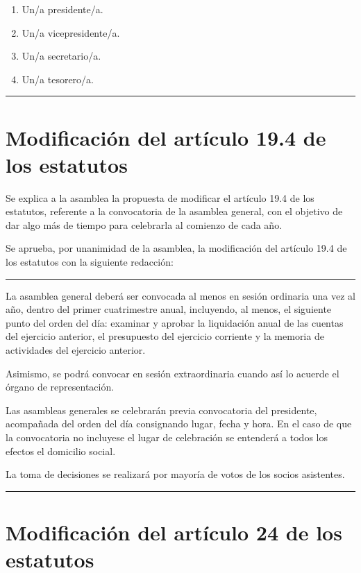 \documentclass[a4paper, 12pt]{article}
\begin{document}
\begin{enumerate}
    \item Un/a presidente/a.  
    \item Un/a vicepresidente/a.  
    \item Un/a secretario/a.  
    \item Un/a tesorero/a.  
\end{enumerate}

\hrule

\section{Modificación del artículo 19.4 de los estatutos}

Se explica a la asamblea la propuesta de modificar el artículo 19.4 de los estatutos, referente a la convocatoria de la asamblea general, con el objetivo de dar algo más de tiempo para celebrarla al comienzo de cada año.

Se aprueba, por unanimidad de la asamblea, la modificación del artículo 19.4 de los estatutos con la siguiente redacción:\\

\hrule
\vspace{3mm}

La asamblea general deberá ser convocada al menos en sesión ordinaria una vez al año, dentro del primer cuatrimestre anual, incluyendo, al menos, el siguiente punto del orden del día: examinar y aprobar la liquidación anual de las cuentas del ejercicio anterior, el presupuesto del ejercicio corriente y la memoria de actividades del ejercicio anterior.

Asimismo, se podrá convocar en sesión extraordinaria cuando así lo acuerde el órgano de representación.

Las asambleas generales se celebrarán previa convocatoria del presidente, acompañada del orden del día consignando lugar, fecha y hora. En el caso de que la convocatoria no incluyese el lugar de celebración se entenderá a todos los efectos el domicilio social.

La toma de decisiones se realizará por mayoría de votos de los socios asistentes.

\vspace{3mm}
\hrule

\section{Modificación del artículo 24 de los estatutos}
\end{document}
